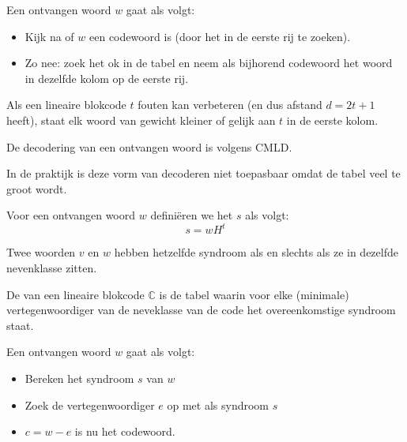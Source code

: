 \documentclass[main.tex]{subfiles}
\begin{document}
\begin{de}
  Een ontvangen woord $w$  gaat als volgt:
  \begin{itemize}
  \item Kijk na of $w$ een codewoord is (door het in de eerste rij te zoeken).
  \item Zo nee: zoek het ok in de tabel en neem als bijhorend codewoord het woord in dezelfde kolom op de eerste rij.
  \end{itemize}
\end{de}

\begin{st}
  Als een lineaire blokcode $t$ fouten kan verbeteren (en dus afstand $d=2t+1$ heeft), staat elk woord van gewicht kleiner of gelijk aan $t$ in de eerste kolom.
\end{st}

\begin{st}
  De decodering van een ontvangen woord is volgens CMLD.
\end{st}

\begin{opm}
  In de praktijk is deze vorm van decoderen niet toepasbaar omdat de tabel veel te groot wordt.
\end{opm}

\begin{de}
  Voor een ontvangen woord $w$ defini\"eren we het  $s$ als volgt:
  \[ s = wH^{t} \]
\end{de}

\begin{st}
  Twee woorden $v$ en $w$ hebben hetzelfde syndroom als en slechts als ze in dezelfde nevenklasse zitten.
\end{st}

\begin{de}
  De  van een lineaire blokcode $\mathbb{C}$ is de tabel waarin voor elke (minimale) vertegenwoordiger van de neveklasse van de code het overeenkomstige syndroom staat.
\end{de}

\begin{de}
  Een ontvangen woord $w$  gaat als volgt:
  \begin{itemize}
  \item Bereken het syndroom $s$ van $w$
  \item Zoek de vertegenwoordiger $e$ op met als syndroom $s$
  \item $c=w-e$ is nu het codewoord.
  \end{itemize}
\end{de}
\end{document}
